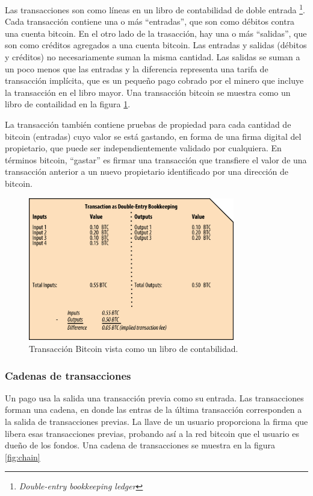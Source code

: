 \documentclass[10pt,journal,compsoc]{IEEEtran}
\begin{document}
Las transacciones son como líneas en un libro de contabilidad de doble entrada \footnote{\emph{Double-entry bookkeeping ledger}}. Cada transacción contiene una o más ``entradas'', que son como débitos contra una cuenta bitcoin. En el otro lado de la trasacción, hay una o más ``salidas'', que son como créditos agregados a una cuenta bitcoin. Las entradas y salidas (débitos y créditos) no necesariamente suman la misma cantidad. Las salidas se suman a un poco menos que las entradas y la diferencia representa una tarifa de transacción implícita, que es un pequeño pago cobrado por el minero que incluye la transacción en el libro mayor. Una transacción bitcoin se muestra como un libro de contailidad en la figura \ref{fig:bookkepping}.

La transacción también contiene pruebas de propiedad para cada cantidad de bitcoin (entradas) cuyo valor se está gastando, en forma de una firma digital del propietario, que puede ser independientemente validado por cualquiera. En términos bitcoin, ``gastar'' es firmar una transacción que transfiere el valor de una transacción anterior a un nuevo propietario identificado por una dirección de bitcoin.

\begin{figure}[h]
    \center
    \includegraphics[width=9cm]{bookkepping}
    \caption{Transacción Bitcoin vista como un libro de contabilidad.}
    \label{fig:bookkepping}
\end{figure}

\subsubsection{Cadenas de transacciones}
Un pago usa la salida una transacción previa como su entrada. Las transacciones forman una cadena, en donde las entras de la última transacción corresponden a la salida de transacciones previas. La llave de un usuario proporciona la firma que libera esas transacciones previas, probando así a la red bitcoin que el usuario es dueño de los fondos. Una cadena de transacciones se muestra en la figura \ref{fig:chain}
\end{document}
